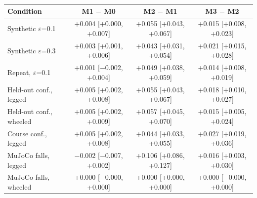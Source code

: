 \begin{tabular}{@{}lccc@{}}
\toprule
Condition & M1 $-$ M0 & M2 $-$ M1 & M3 $-$ M2 \\ \midrule
Synthetic $\varepsilon$=0.1 & +0.004 [+0.000, +0.007] & +0.055 [+0.043, +0.067] & +0.015 [+0.008, +0.023] \\
Synthetic $\varepsilon$=0.3 & +0.003 [+0.001, +0.006] & +0.043 [+0.031, +0.054] & +0.021 [+0.015, +0.028] \\
Repeat, $\varepsilon$=0.1 & +0.001 [\mbox{$-$}0.002, +0.004] & +0.049 [+0.038, +0.059] & +0.014 [+0.008, +0.019] \\
Held-out conf., legged & +0.005 [+0.002, +0.008] & +0.055 [+0.043, +0.067] & +0.018 [+0.010, +0.027] \\
Held-out conf., wheeled & +0.005 [+0.002, +0.009] & +0.057 [+0.045, +0.070] & +0.015 [+0.005, +0.024] \\
Course conf., legged & +0.005 [+0.002, +0.008] & +0.044 [+0.033, +0.055] & +0.027 [+0.019, +0.036] \\
MuJoCo falls, legged & \mbox{$-$}0.002 [\mbox{$-$}0.007, +0.002] & +0.106 [+0.086, +0.127] & +0.016 [+0.003, +0.030] \\
MuJoCo falls, wheeled & +0.000 [\mbox{$-$}0.000, +0.000] & +0.000 [+0.000, +0.000] & +0.000 [\mbox{$-$}0.000, +0.000] \\
\bottomrule
\end{tabular}